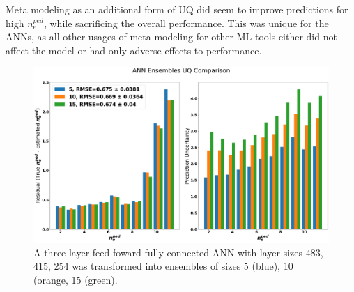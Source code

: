 \documentclass[a4paper, twoside, final, 12pt]{article}
\begin{document}
{Meta modeling as an additional form of UQ did seem to improve predictions for high $n_e^{ped}$, while sacrificing the overall performance.
This was unique for the ANNs, as all other usages of meta-modeling for other ML tools either did not affect the model or had only adverse effects to performance.
\begin{figure}
	\centering
	\includegraphics[scale=0.25]{./src/ANN_ensemble_comp}
	\caption{A three layer feed foward fully connected ANN with layer sizes 483, 415, 254 was transformed into ensembles of sizes 5 (blue), 10 (orange, 15 (green). }
	\label{fig:ANN_UQ}
\end{figure}
}
\end{document}
